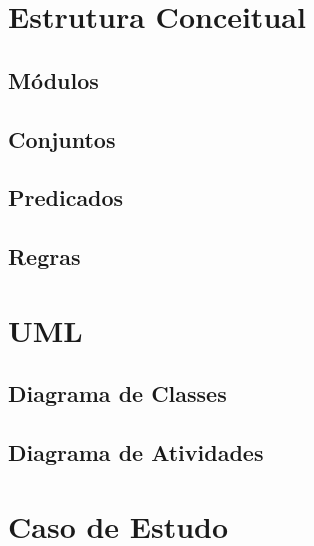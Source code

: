\documentclass[openright]{normas-utf-tex} %
\begin{document}
	\section{Estrutura Conceitual}

	

		\subsection{Módulos}

			
		
		\subsection{Conjuntos}

			

		\subsection{Predicados}

			

		\subsection{Regras}

			

	\section{UML}
		\subsection{Diagrama de Classes}

			

		\subsection{Diagrama de Atividades}

			

	\section{Caso de Estudo}
\end{document}

